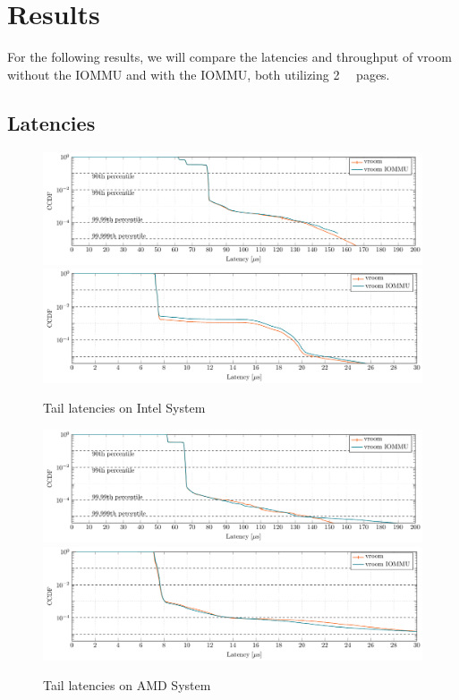 \section{Results}
For the following results, we will compare the latencies and throughput of vroom without the IOMMU and with the IOMMU, both utilizing \qty{2}{\mebi\byte} pages.

\subsection{Latencies}
\begin{figure}[H]
  \centering
   {\includegraphics[width=.99\textwidth]{figures/lats_ccdf_2MiB_qd1t1_read} \label{fig:ccdf-read}}
   {\includegraphics[width=.99\textwidth]{figures/lats_ccdf_2MiB_qd1t1} \label{fig:ccdf-write}}
  \caption{Tail latencies on Intel System}
  \label{fig:ccdf}
\end{figure}

\begin{figure}[H]
  \centering
   {\includegraphics[width=.99\textwidth]{figures/lats_ccdf_2MiB_qd1t1_read_epyc} \label{fig:ccdf-read-epyc}}
   {\includegraphics[width=.99\textwidth]{figures/lats_ccdf_2MiB_qd1t1_epyc} \label{fig:ccdf-write-epyc}}
  \caption{Tail latencies on AMD System}
  \label{fig:ccdf-epyc}
\end{figure}

